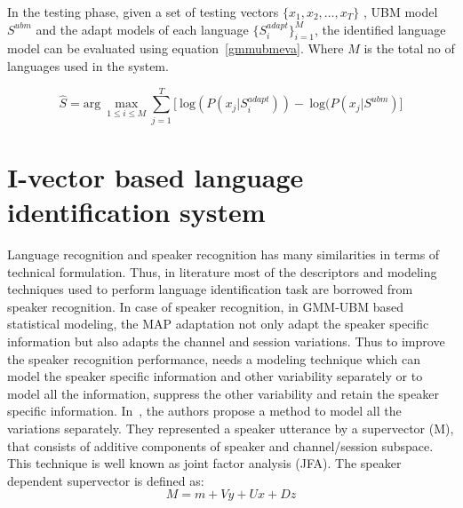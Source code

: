 \begin{spacing}{1.5}
In the testing phase, given a set of testing vectors $\{x_{1},x_{2},\ldots,x_{T}\}$ , UBM model $S^{ubm}$ and the adapt models of each language $\{S_{i}^{adapt}\}_{i=1}^{M}$, the identified language model can be evaluated using equation~\ref{gmmubmeva}. Where $M$ is the total no of languages used in the system.

\begin{equation}
    \label{gmmubmeva}
   \hat{S}=\mbox{arg}~\max_{1 \leq i \leq M}\sum_{j=1}^{T}\bigg[~\mbox{log}(P(x_{j}|S_{i}^{adapt})) - ~\mbox{log}(P(x_{j}|S^{ubm})\bigg]
\end{equation}

\section{I-vector based language identification system}
\label{ivector}
Language recognition and speaker recognition has many similarities in terms of technical formulation. Thus, in literature most of the descriptors and modeling techniques used to perform language identification task are borrowed from speaker recognition. In case of speaker recognition, in GMM-UBM based statistical modeling, the MAP adaptation not only adapt the speaker specific information but also adapts the channel and session variations. Thus to improve the speaker recognition performance, needs a modeling technique which can model the speaker specific information and other variability separately or to model all the information, suppress the other variability and retain the speaker specific information. In~\cite{kenny2005joint}, the authors propose a method to model all the variations separately. They represented a speaker utterance by a supervector (M), that consists of additive components of speaker and channel/session subspace. This technique is well known as joint factor analysis (JFA).  The speaker dependent supervector is defined as:
\begin{equation}
    \label{jfa}
    M=m+Vy+Ux+Dz
\end{equation}

\end{spacing}
